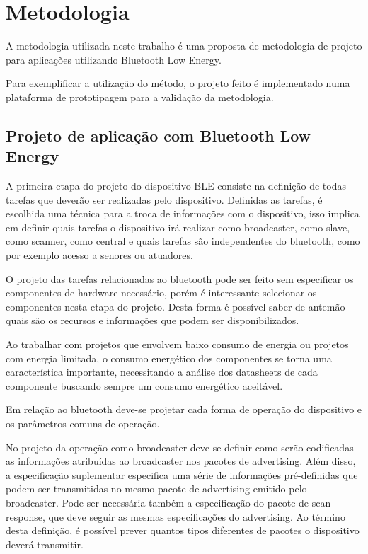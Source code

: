 \section{Metodologia}

A metodologia utilizada neste trabalho é uma proposta de metodologia de projeto
para aplicações utilizando Bluetooth Low Energy. 

Para exemplificar a utilização do método, o projeto feito é implementado numa
plataforma de prototipagem para a validação da metodologia.

\subsection{Projeto de aplicação com Bluetooth Low Energy}

A primeira etapa do projeto do dispositivo BLE consiste na definição de todas
tarefas que deverão ser realizadas pelo dispositivo. Definidas as tarefas, é
escolhida uma técnica para a troca de informações com o dispositivo, isso
implica em definir quais tarefas o dispositivo irá realizar como broadcaster,
como slave, como scanner, como central e quais tarefas são independentes do
bluetooth, como por exemplo acesso a senores ou atuadores.

O projeto das tarefas relacionadas ao bluetooth pode ser feito sem especificar
os componentes de hardware necessário, porém é interessante selecionar os
componentes nesta etapa do projeto. Desta forma é possível saber de antemão
quais são os recursos e informações que podem ser disponibilizados.

Ao trabalhar com projetos que envolvem baixo consumo de energia ou projetos com
energia limitada, o consumo energético dos componentes se torna uma
característica importante, necessitando a análise dos datasheets de cada
componente buscando sempre um consumo energético aceitável.

Em relação ao bluetooth deve-se projetar cada forma de operação do dispositivo e
os parâmetros comuns de operação.

No projeto da operação como broadcaster deve-se definir como serão codificadas
as informações atribuídas ao broadcaster nos pacotes de advertising. Além
disso, a especificação suplementar especifica uma série de informações
pré-definidas que podem ser transmitidas no mesmo pacote de advertising emitido
pelo broadcaster\cite{ble4sup}. Pode ser necessária também a especificação do
pacote de scan response, que deve seguir as mesmas especificações do
advertising. Ao término desta definição, é possível prever quantos tipos
diferentes de pacotes o dispositivo deverá transmitir.

